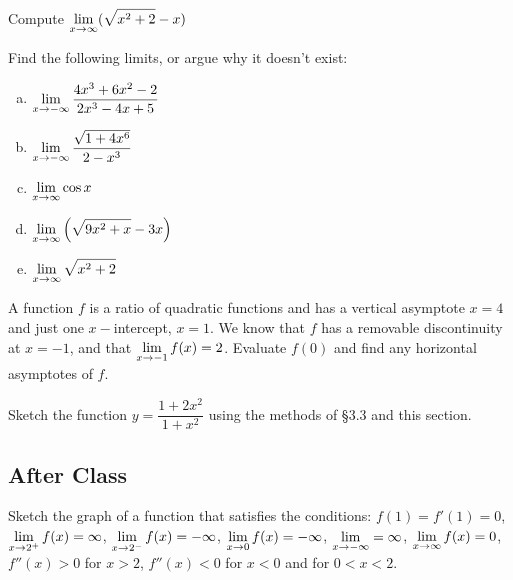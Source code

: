 \documentclass[notes]{subfiles}
\begin{document}
		\begin{ex}
			Compute $\displaystyle \lim_{x\to \infty} (\sqrt{x^2+2}-x)$
		\end{ex}
			\newpage
		\begin{ex}
			Find the following limits, or argue why it doesn't exist:
			\begin{enumerate}[(a)]
				\item $\displaystyle \lim_{x\to -\infty} \dfrac{4x^3 + 6x^2 - 2}{2x^3 - 4x + 5}$
					
				\item $\displaystyle \lim_{x\to -\infty} \dfrac{\sqrt{1+4x^6}}{2-x^3}$
					
				\item $\displaystyle \lim_{x\to \infty} \cos x$
					
				\item $\displaystyle \lim_{x\to \infty} \left( \sqrt{9x^2 + x} - 3x\right)$
					
				\item $\displaystyle \lim_{x\to \infty} \sqrt{x^2 + 2}$
			\end{enumerate}
		\end{ex}		
			\newpage
				
		\begin{ex}
			A function $f$ is a ratio of quadratic functions and has a vertical asymptote $x=4$ and just one $x-$intercept, $x=1$.  We know that $f$ has a removable discontinuity at $x=-1$, and that $\displaystyle \lim_{x\to -1} f(x) = 2$.  Evaluate $f(0)$ and find any horizontal asymptotes of $f$.
		\end{ex}
			\vs{1}
			
		\begin{ex}
			Sketch the function $y = \dfrac{1 + 2x^2}{1+x^2}$ using the methods of \S3.3 and this section.
		\end{ex}		
			\vs{1}

			\newpage
			
	\subsection*{After Class}
		
			
		\begin{ex}
			Sketch the graph of a function that satisfies the conditions: $f(1) = f'(1) = 0$, $\displaystyle \lim_{x\to 2^+} f(x) = \infty$, $\displaystyle \lim_{x\to 2^-} f(x) = -\infty$, $\displaystyle \lim_{x\to 0} f(x) = -\infty$, $\displaystyle \lim_{x\to -\infty} = \infty$, $\displaystyle \lim_{x\to \infty} f(x) = 0$, $f''(x) > 0$ for $x > 2$, $f''(x) < 0$ for $x < 0$ and for $0 < x < 2$.
		\end{ex}
			
\end{document}
